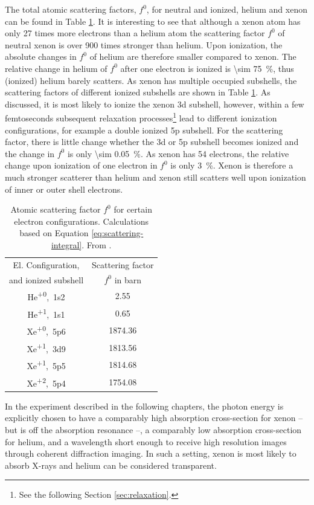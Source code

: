 The total atomic scattering factors, $f^{0}$, for neutral and ionized, helium and xenon can be found in Table \ref{tab:helium-xenon-el-scattering-crossection}. It is interesting to see that although a xenon atom has only 27 times more electrons than a helium atom the scattering factor $f^{0}$ of neutral xenon is over 900 times stronger than helium. Upon ionization, the absolute changes in $f^{0}$ of helium are therefore smaller compared to xenon. The relative change in helium of $f^{0}$ after one electron is ionized is \SI{\sim 75}{\percent}, thus (ionized) helium barely scatters. As xenon has multiple occupied subshells, the scattering factors of different ionized subshells are shown in Table \ref{tab:helium-xenon-el-scattering-crossection}. As discussed, it is most likely to ionize the xenon 3d subshell, however, within a few femtoseconds subsequent relaxation processes\footnote{See the following Section \ref{sec:relaxation}.} lead to different ionization configurations, for example a double ionized 5p subshell. For the scattering factor, there is little change whether the 3d or 5p subshell becomes ionized and the change in $f^{0}$ is only \SI{\sim 0.05}{\percent}. As xenon has 54 electrons, the relative change upon ionization of one electron in $f^{0}$ is only \SI{3}{\percent}. Xenon is therefore a much stronger scatterer than helium and xenon still scatters well upon ionization of inner or outer shell electrons.  
\begin{table}
	\centering
		\begin{tabular}{ | c | c | }
		\hline
			El. Configuration, & Scattering factor \\
			and ionized subshell & $f^{0}$ in barn \\ \hline
			He\textsuperscript{+0},\ 1s2 & 2.55  \\ \hline
			He\textsuperscript{+1},\ 1s1 & 0.65  \\ \hline
			Xe\textsuperscript{+0},\ 5p6 & 1874.36  \\ \hline
			Xe\textsuperscript{+1},\ 3d9 & 1813.56  \\ \hline
			Xe\textsuperscript{+1},\ 5p5 & 1814.68  \\ \hline
			Xe\textsuperscript{+2},\ 5p4 & 1754.08  \\ \hline
		\end{tabular}
	\caption[Atomic scattering factors for helium and xenon.]{Atomic scattering factor $f^{0}$ for certain electron configurations. Calculations based on Equation \eqref{eq:scattering-integral}. From \citep{Ho-2016-PC}.}
	\label{tab:helium-xenon-el-scattering-crossection}
\end{table}
In the experiment described in the following chapters, the photon energy is explicitly chosen to have a comparably high absorption cross-section for xenon -- but is off the absorption resonance --, a comparably low absorption cross-section for helium, and a wavelength short enough to receive high resolution images through coherent diffraction imaging. In such a setting, xenon is most likely to absorb X-rays and helium can be considered transparent.
%
%
%
%
%
